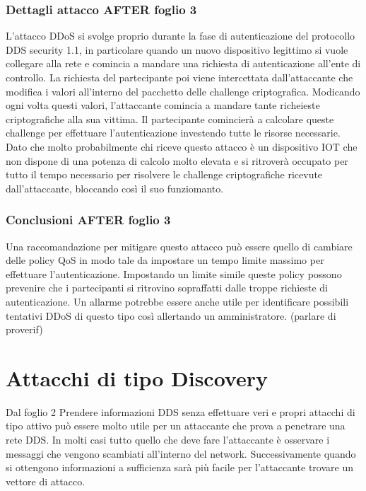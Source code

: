 \subsubsection{Dettagli attacco AFTER foglio 3}
L'attacco DDoS si svolge proprio durante la fase di autenticazione del protocollo
DDS security 1.1, in particolare quando un nuovo dispositivo legittimo si vuole 
collegare alla rete e comincia a mandare una richiesta di autenticazione
all'ente di controllo. La richiesta del partecipante poi viene intercettata 
dall'attaccante che modifica i valori all'interno del pacchetto delle 
challenge criptografica. Modicando ogni volta questi valori, l'attaccante
comincia a mandare tante richeieste criptografiche alla sua vittima.
Il partecipante comincierà a calcolare queste challenge per effettuare 
l'autenticazione investendo tutte le risorse necessarie.
Dato che molto probabilmente chi riceve questo attacco è un dispositivo IOT 
che non dispone di una potenza di calcolo molto elevata e si ritroverà
occupato per tutto il tempo necessario per risolvere le challenge criptografiche
ricevute dall'attaccante, bloccando così il suo funziomanto.

\subsubsection{Conclusioni AFTER foglio 3}
Una raccomandazione per mitigare questo attacco può essere quello di cambiare delle
policy QoS in modo tale da impostare un tempo limite massimo per effettuare
l'autenticazione. Impostando un limite simile queste policy possono prevenire
che i partecipanti si ritrovino sopraffatti dalle troppe richieste di 
autenticazione. Un allarme potrebbe essere anche utile per identificare possibili
tentativi DDoS di questo tipo così allertando un amministratore. (parlare di proverif)

\section{Attacchi di tipo Discovery}
Dal foglio 2
Prendere informazioni DDS senza effettuare veri e propri
attacchi di tipo attivo può essere molto utile per un attaccante che prova
a penetrare una rete DDS. In molti casi tutto quello che deve fare l'attaccante
è osservare i messaggi che vengono scambiati all'interno del network.
Successivamente quando si ottengono informazioni a sufficienza sarà più
facile per l'attaccante trovare un vettore di attacco.

